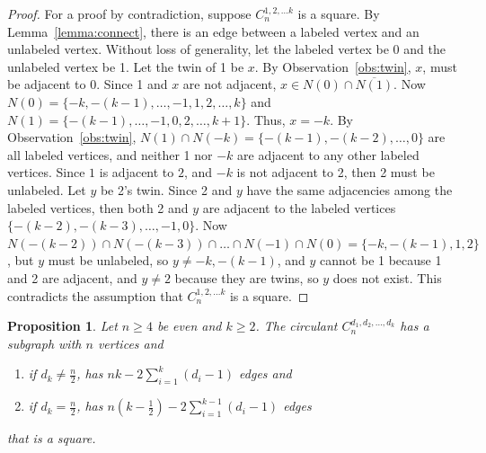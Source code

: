 \documentclass{article}
\newtheorem{proposition}[theorem]{Proposition}
\theoremstyle{definition}
\begin{document}
\begin{proof} 
For a proof by contradiction, suppose $C_{n}^{1,2, \ldots k}$ is a square. By Lemma~\ref{lemma:connect}, there is an edge between a labeled vertex and an unlabeled vertex. Without loss of generality, let the labeled vertex be 0 and the unlabeled vertex be 1. Let the twin of 1 be $x$. By Observation~\ref{obs:twin}, $x$, must be adjacent to 0. Since 1 and $x$ are not adjacent, 
$x\in N(0)\cap \overline{N(1)}$. Now $N(0)=\{-k,-(k-1),\ldots, -1, 1, 2, \ldots, k\}$ and $N(1)=\{-(k-1),\ldots, -1, 0,  2, \ldots, k+1\}$. Thus, $x=-k$. By Observation~\ref{obs:twin}, $N(1)\cap N(-k)=\{-(k-1), -(k-2), \ldots, 0\}$ are all labeled vertices, and neither 1 nor $-k$ are adjacent to any other labeled vertices. Since $1$ is adjacent to $2$, and $-k$ is not adjacent to 2, then 2 must 
be unlabeled. Let $y$ be 2's twin. Since 2 and $y$ have the same adjacencies among the labeled vertices, then both 2 and $y$ are adjacent to the labeled vertices  $\{-(k-2), -(k-3), \ldots, -1,0\}$. %
Now $N(-(k-2))\cap N(-(k-3)) \cap \ldots \cap N(-1)\cap N(0) = \{ -k, -(k-1),1,2\}$, but $y$ must be unlabeled, so $y\neq -k, -(k-1)$, and $y$ cannot be 1 because 1 and 2 are adjacent, and $y\neq 2$ because they are twins, so $y$ does not exist. This contradicts the assumption that $C_{n}^{1,2, \ldots k}$ is a square. 
\end{proof}

\begin{proposition}
    \label{prop:circ-D} Let $n\geq 4$ be even and $k\geq 2$. 
The circulant $C_{n}^{d_1,d_2, \ldots, d_k}$ has a subgraph with $n$ vertices and
\begin{enumerate}
    \item if $d_k \neq \frac{n}{2}$, has $nk - 2 \sum_{i=1}^k (d_i-1)$ edges and
    \item if $d_k = \frac{n}{2}$, has $n\left(k-\frac{1}{2}\right)-2\sum_{i=1}^{k-1}(d_i-1)$ edges
\end{enumerate}
that is a square.
\end{proposition}
\end{document}
